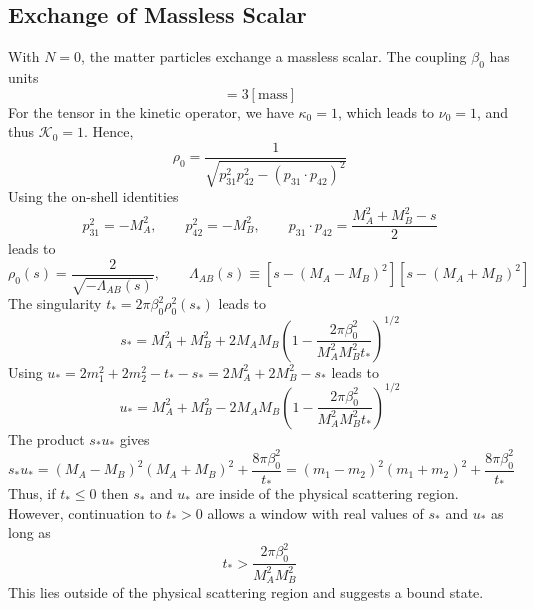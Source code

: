 \subsection{Exchange of Massless Scalar}
With $N = 0$, the matter particles exchange a massless scalar. The coupling $\beta_{0}$ has units
\begin{equation}
	[\beta_{0}] = 3 [\text{mass}]
\end{equation}
For the tensor in the kinetic operator, we have $\kappa_{0} = 1$, which leads to $\nu_{0} = 1$, and thus $\mathcal{K}_{0} = 1$. Hence,
\begin{equation}
	\rho_{0} = \frac{1}{\sqrt{p_{31}^{2} p_{42}^{2} - (p_{31} \cdot p_{42})^{2}}}
\end{equation}
Using the on-shell identities
\begin{equation}
	p_{31}^{2} = -M_{A}^{2}, \qquad p_{42}^{2} = -M_{B}^{2}, \qquad p_{31} \cdot p_{42} = \frac{M_{A}^{2} + M_{B}^{2} - s}{2}
\end{equation}
leads to
\begin{equation}
	\rho_{0}(s) = \frac{2}{\sqrt{-\Lambda_{AB}(s)}}, \qquad \Lambda_{AB}(s) \equiv [s - (M_{A} - M_{B})^{2}] [s - (M_{A} + M_{B})^{2}]
\end{equation}
The singularity $t_{*} = 2 \pi \beta_{0}^{2} \rho_{0}^{2}(s_{*})$ leads to
\begin{equation}
	s_{*} = M_{A}^{2} + M_{B}^{2} + 2 M_{A} M_{B} \left(1 - \frac{2 \pi \beta_{0}^{2}}{M_{A}^{2} M_{B}^{2} t_{*}} \right)^{1/2} \label{3s0}
\end{equation}
Using $u_{*} = 2m_{1}^{2} + 2m_{2}^{2} - t_{*} - s_{*}= 2M_{A}^{2} + 2M_{B}^{2} - s_{*}$ leads to
\begin{equation}
	u_{*} = M_{A}^{2} + M_{B}^{2} - 2 M_{A} M_{B} \left(1 - \frac{2 \pi \beta_{0}^{2}}{M_{A}^{2} M_{B}^{2} t_{*}} \right)^{1/2}
\end{equation}
The product $s_{*} u_{*}$ gives
\begin{equation}
	s_{*} u_{*} = (M_{A} - M_{B})^{2}(M_{A} + M_{B})^{2} + \frac{8 \pi \beta_{0}^{2}}{t_{*}}
	= (m_{1} - m_{2})^{2}(m_{1} + m_{2})^{2} + \frac{8 \pi \beta_{0}^{2}}{t_{*}} \label{3su0}
\end{equation}
Thus, if $t_{*} \leq 0$ then $s_{*}$ and $u_{*}$ are inside of the physical scattering region. However, continuation to $t_{*} > 0$ allows a window with real values of $s_{*}$ and $u_{*}$ as long as
\begin{equation}
	t_{*} > \frac{2 \pi \beta_{0}^{2}}{M_{A}^{2} M_{B}^{2}}
\end{equation}
This lies outside of the physical scattering region and suggests a bound state.

